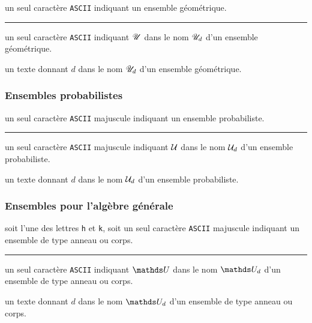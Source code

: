\documentclass[12pt,a4paper]{article}
\theoremstyle{definition}
\newcommand\separation{
	\medskip
	\hfill\rule{0.5\textwidth}{0.75pt}\hfill
	\medskip
}
\newcommand\ascii{\texttt{ASCII}}
\begin{document}

\IDarg{} un seul caractère \ascii{} indiquant un ensemble géométrique.


\separation



 un seul caractère \ascii{} indiquant $\setgeo{U}$ dans le nom $\setgeo*{U}{d}$ d'un ensemble géométrique.

 un texte donnant $d$ dans le nom $\setgeo*{U}{d}$ d'un ensemble géométrique.




\subsubsection{Ensembles probabilistes}




\IDarg{} un seul caractère \ascii{} majuscule indiquant un ensemble probabiliste.


\separation



 un seul caractère \ascii{} majuscule indiquant $\setproba{U}$ dans le nom $\setproba*{U}{d}$ d'un ensemble probabiliste.

 un texte donnant $d$ dans le nom $\setproba*{U}{d}$ d'un ensemble probabiliste.




\subsubsection{Ensembles pour l'algèbre générale}




\IDarg{} soit l'une des lettres  \texttt{h} et \texttt{k}, soit un seul caractère \ascii{} majuscule indiquant un ensemble de type anneau ou corps.


\separation



 un seul caractère \ascii{} indiquant $\setalge{U}$ dans le nom $\setalge*{U}{d}$ d'un ensemble de type anneau ou corps.

 un texte donnant $d$ dans le nom $\setalge*{U}{d}$ d'un ensemble de type anneau ou corps.


\end{document}
